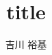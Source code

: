 \documentclass[twocolumn,12pt,a4paper]{article}
\title{title}
\date{}
\author{吉川 裕基}
\begin{document}
\twocolumn[
\maketitle
\begin{abstract}
\end{abstract}
]
\section{}



\begin{thebibliography}{99}
\end{thebibliography}
\end{document}

